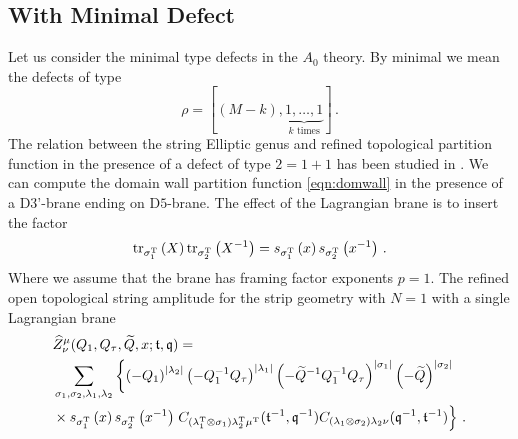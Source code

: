 \documentclass[main.tex]{subfiles}
\begin{document}
\subsection{With Minimal Defect}
Let us consider the minimal type defects in the $A_0$ theory. By minimal we mean the defects of type
\begin{equation}\label{eqn:minimalpart}
\rho=[(M-k),\underbrace{1,\dots,1}_{\text{$k$ times}}]\,.
\end{equation}
The relation between the string Elliptic genus and refined topological partition function in the presence of a defect of type $2=1+1$ has been studied in \cite{Mori:2016qof}. We can compute the domain wall partition function \eqref{eqn:domwall} in the presence of a D$3$'-brane ending on D$5$-brane. The effect of the Lagrangian brane is to insert the factor
\begin{equation}
\operatorname{tr}_{\sigma_1^{\operatorname{T}}}\left(X\right)\operatorname{tr}_{\sigma_2^{\operatorname{T}}}\left(X^{-1}\right)=s_{\sigma_1^{\operatorname{T}}}\left(x\right)s_{\sigma^{\operatorname{T}}_2}\left(x^{-1}\right)\,.
\end{equation}  
Where we assume that the brane has framing factor exponents $p=1$. The refined open topological string amplitude for the strip geometry with $N=1$ with a single Lagrangian brane
\begin{equation}\label{eqn:A0minimal}
\begin{aligned}
&\widehat{Z}^{\mu}_{\nu}(Q_1,Q_{\tau},\widetilde{Q},x;\tbf,\qbf)=\\
&\sum_{\sigma_1,\sigma_2,\lambda_1,\lambda_2}\left\{\left(-Q_1\right)^{|\lambda_2|}\left(-Q_1^{-1}Q_{\tau}\right)^{|\lambda_1|}\left(-\widetilde{Q}^{-1}Q_1^{-1}Q_{\tau}\right)^{|\sigma_1|}\left(-\widetilde{Q}\right)^{|\sigma_2|}\right.\\
& \times s_{\sigma_1^{\trans}}\left(x\right)s_{\sigma^{\trans}_2}\left(x^{-1}\right)\left.\vphantom{\left(-Q_2\right)^{|\delta|}}C_{(\lambda_1^{\trans}\otimes\sigma_1)\lambda_2^{\trans}\mu^{\trans}}(\tbf^{-1},\qbf^{-1})C_{(\lambda_1\otimes\sigma_2)\lambda_2\nu}(\qbf^{-1},\tbf^{-1})\right\}\,.
\end{aligned}
\end{equation}
\end{document}
